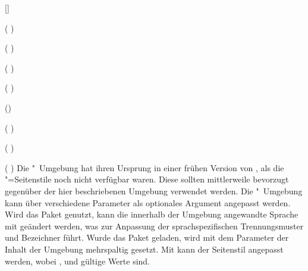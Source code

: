 \begin{Declaration*}{}
\begin{Declaration*}{}
\begin{Declaration*}{}
\begin{Declaration}{[]}
\begin{Declaration}{}
\begin{Declaration}{}
\begin{Declaration}[v2.02]{}
\begin{Declaration}{}(%
)
\begin{Declaration}[v2.03]{}(%
)
\begin{Declaration}[v2.03]{}(%
)
\begin{Declaration}{}(%
)
\begin{Declaration}[v2.03]{%
}()
\begin{Declaration}[v2.02]{}(%
)
\begin{Declaration}[v2.02]{}(%
)
\begin{Declaration}[v2.02]{}(%
)
\printdeclarationlist%
%
%
%
%
Die "~Umgebung hat ihren Ursprung in einer frühen Version 
von \TUDScript, als die "=Seitenstile noch nicht 
verfügbar waren. Diese sollten mittlerweile bevorzugt gegenüber der hier 
beschriebenen Umgebung verwendet werden. Die "~Umgebung 
kann über verschiedene Parameter als optionales Argument angepasst werden. Wird 
das Paket  genutzt, kann die innerhalb der Umgebung angewandte 
Sprache mit  geändert 
werden, was zur Anpassung der sprachspezifischen Trennungsmuster und Bezeichner 
führt. Wurde das Paket  geladen, wird mit dem Parameter 
 der Inhalt der Umgebung 
mehrspaltig gesetzt. Mit  kann der 
Seitenstil angepasst werden, wobei ,  und 
 gültige Werte sind. 


\end{Declaration}
\end{Declaration}
\end{Declaration}
\end{Declaration}
\end{Declaration}
\end{Declaration}
\end{Declaration}
\end{Declaration}
\end{Declaration}
\end{Declaration}
\end{Declaration}
\end{Declaration}
\end{Declaration*}
\end{Declaration*}
\end{Declaration*}
